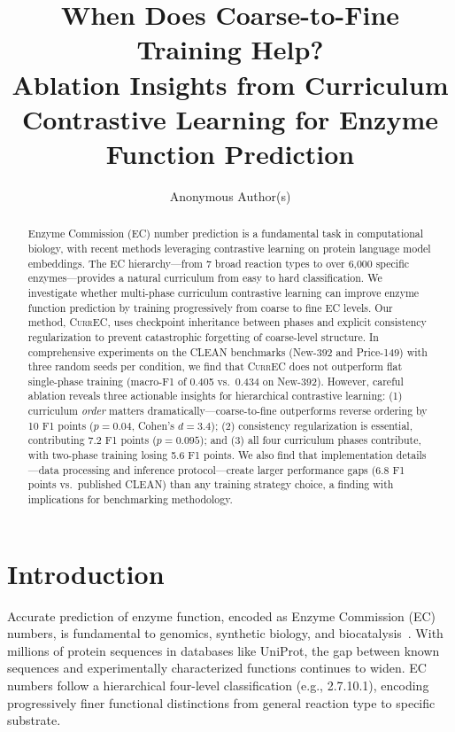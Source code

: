 \documentclass{article}
\title{When Does Coarse-to-Fine Training Help? \\Ablation Insights from Curriculum Contrastive Learning for Enzyme Function Prediction}
\author{
  Anonymous Author(s)
}
\newcommand{\currec}{\textsc{CurrEC}}
\begin{document}
\maketitle

\begin{abstract}
Enzyme Commission (EC) number prediction is a fundamental task in computational biology, with recent methods leveraging contrastive learning on protein language model embeddings. The EC hierarchy---from 7 broad reaction types to over 6{,}000 specific enzymes---provides a natural curriculum from easy to hard classification. We investigate whether multi-phase curriculum contrastive learning can improve enzyme function prediction by training progressively from coarse to fine EC levels. Our method, \currec{}, uses checkpoint inheritance between phases and explicit consistency regularization to prevent catastrophic forgetting of coarse-level structure. In comprehensive experiments on the CLEAN benchmarks (New-392 and Price-149) with three random seeds per condition, we find that \currec{} does not outperform flat single-phase training (macro-F1 of 0.405 vs.\ 0.434 on New-392). However, careful ablation reveals three actionable insights for hierarchical contrastive learning: (1) curriculum \emph{order} matters dramatically---coarse-to-fine outperforms reverse ordering by 10 F1 points ($p=0.04$, Cohen's $d=3.4$); (2) consistency regularization is essential, contributing 7.2 F1 points ($p=0.095$); and (3) all four curriculum phases contribute, with two-phase training losing 5.6 F1 points. We also find that implementation details---data processing and inference protocol---create larger performance gaps (6.8 F1 points vs.\ published CLEAN) than any training strategy choice, a finding with implications for benchmarking methodology.
\end{abstract}

\section{Introduction}

Accurate prediction of enzyme function, encoded as Enzyme Commission (EC) numbers, is fundamental to genomics, synthetic biology, and biocatalysis~\citep{yu2023enzyme}. With millions of protein sequences in databases like UniProt, the gap between known sequences and experimentally characterized functions continues to widen. EC numbers follow a hierarchical four-level classification (e.g., 2.7.10.1), encoding progressively finer functional distinctions from general reaction type to specific substrate.
\end{document}
